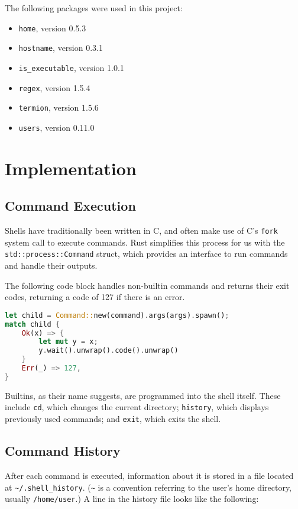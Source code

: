 \documentclass[12pt,twoside]{report} %
\begin{document}
	The following packages were used in this project:
	\begin{itemize}[noitemsep,topsep=0pt]
		\item \verb|home|, version 0.5.3
		\item \verb|hostname|, version 0.3.1
		\item \verb|is_executable|, version 1.0.1
		\item \verb|regex|, version 1.5.4
		\item \verb|termion|, version 1.5.6
		\item \verb|users|, version 0.11.0
	\end{itemize}

	\section{Implementation} \label{sec:implementation}

	\subsection{Command Execution} \label{sec:command-execution}
	Shells have traditionally been written in C, and often make use of C's \verb|fork| system call to execute commands. Rust simplifies this process for us with the \verb|std::process::Command| struct, which provides an interface to run commands and handle their outputs.

	The following code block handles non-builtin commands and returns their exit codes, returning a code of 127 if there is an error.

	\lstset{style=boxed}
	\begin{lstlisting}[language=Rust]
let child = Command::new(command).args(args).spawn();
match child {
    Ok(x) => {
        let mut y = x;
        y.wait().unwrap().code().unwrap()
    }
    Err(_) => 127,
}\end{lstlisting}

	Builtins, as their name suggests, are programmed into the shell itself. These include \verb|cd|, which changes the current directory; \verb|history|, which displays previously used commands; and \verb|exit|, which exits the shell.

	\subsection{Command History} \label{sec:command-history}
	After each command is executed, information about it is stored in a file located at \verb|~/.shell_history|. (\verb|~| is a convention referring to the user's home directory, usually \verb|/home/user|.) A line in the history file looks like the following:
	
\end{document}
